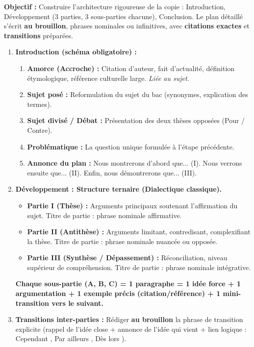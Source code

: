 \documentclass[11pt]{article}
\begin{document}
\begin{methode}
    \textbf{Objectif :} Construire l'architecture rigoureuse de la copie : Introduction, Développement (3 parties, 3 sous-parties chacune), Conclusion. Le plan détaillé s'écrit \textbf{au brouillon}, phrases nominales ou infinitives, avec \textbf{citations exactes} et \textbf{transitions} préparées.
    \begin{enumerate}
        \item \textbf{Introduction (schéma obligatoire) :}
            \begin{enumerate}
                \item \textbf{Amorce (Accroche) :} Citation d'auteur, fait d'actualité, définition étymologique, référence culturelle large. \textit{Liée au sujet.}
                \item \textbf{Sujet posé :} Reformulation du sujet du bac (synonymes, explication des termes).
                \item \textbf{Sujet divisé / Débat :} Présentation des deux thèses opposées (Pour / Contre).
                \item \textbf{Problématique :} La question unique formulée à l'étape précédente.
                \item \textbf{Annonce du plan :} \og Nous montrerons d'abord que... (I). Nous verrons ensuite que... (II). Enfin, nous démontrerons que... (III). \fg
            \end{enumerate}
        \item \textbf{Développement : Structure ternaire (Dialectique classique).}
            \begin{itemize}
                \item \textbf{Partie I (Thèse) :} Arguments principaux soutenant l'affirmation du sujet. Titre de partie : phrase nominale affirmative.
                \item \textbf{Partie II (Antithèse) :} Arguments limitant, contredisant, complexifiant la thèse. Titre de partie : phrase nominale nuancée ou opposée.
                \item \textbf{Partie III (Synthèse / Dépassement) :} Réconciliation, niveau supérieur de compréhension. Titre de partie : phrase nominale intégrative.
            \end{itemize}
            \textbf{Chaque sous-partie (A, B, C) = 1 paragraphe = 1 idée force + 1 argumentation + 1 exemple précis (citation/référence) + 1 mini-transition vers le suivant.}
        \item \textbf{Transitions inter-parties :} Rédiger \textbf{au brouillon} la phrase de transition explicite (rappel de l'idée close + annonce de l'idée qui vient + lien logique : \og Cependant \fg, \og Par ailleurs \fg, \og Dès lors \fg).

\end{enumerate}
\end{methode}
\end{document}
